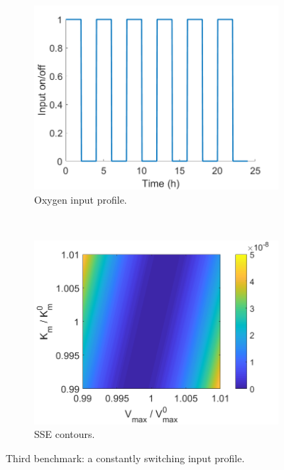 \begin{figure}[H]
	\centering
	\begin{subfigure}[b]{0.45\textwidth}
		\includegraphics[width=\textwidth]{figure/paper 1/compare3input.png}
		\caption{Oxygen input profile.}
		\label{inputcompare3}
	\end{subfigure}
	~ %
	\begin{subfigure}[b]{0.45\textwidth}
		\includegraphics[width=\textwidth]{figure/paper 1/compare3.png}
		\caption{SSE contours.}
		\label{SSEcompare3}
	\end{subfigure}
	\caption{Third benchmark: a constantly switching input profile.}
	\label{compare3}
\end{figure}
